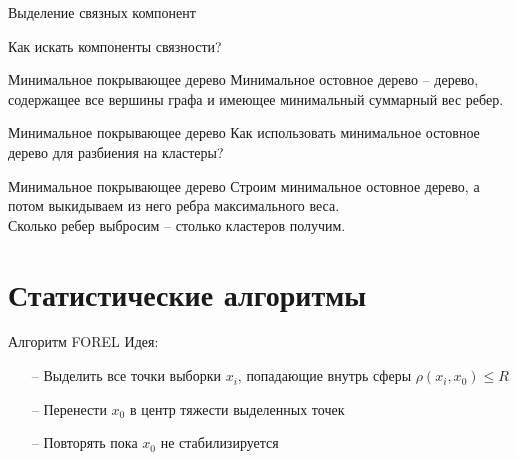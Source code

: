 \documentclass[10pt]{beamer}
\begin{document}
\begin{frame}{Выделение связных компонент}
  \begin{center}
    Как искать \alert{компоненты связности}?
  \end{center}
\end{frame}

\begin{frame}{Минимальное покрывающее дерево}
	Минимальное остовное дерево -- дерево, содержащее все вершины графа и имеющее минимальный суммарный вес ребер.\\
\end{frame}

\begin{frame}{Минимальное покрывающее дерево}
  Как использовать минимальное остовное дерево для разбиения на кластеры?
\end{frame}

\begin{frame}{Минимальное покрывающее дерево}
	Строим минимальное остовное дерево, а потом выкидываем из него ребра максимального веса.\\
	\bigbreak
	Сколько ребер выбросим -- столько кластеров получим.
\end{frame}

\section{Статистические алгоритмы}

\begin{frame}{Алгоритм FOREL}
  \alert{Идея}:\\
	\begin{itemize}
		\item[--] Выделить все точки выборки $x_i$, попадающие внутрь сферы $\rho(x_i, x_0) \leq R$
		\item[--] Перенести $x_0$ в центр тяжести выделенных точек
		\item[--] Повторять пока $x_0$ не стабилизируется
	\end{itemize}
\end{frame}
\end{document}

